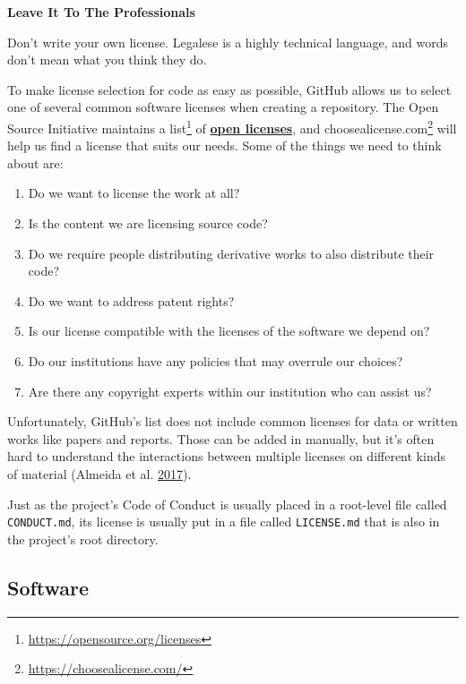 \documentclass[
]{krantz}
\providecommand{\tightlist}{%
  \setlength{\itemsep}{0pt}\setlength{\parskip}{0pt}}
\renewenvironment{quote}{\begin{VF}}{\end{VF}}
\renewcommand{\href}[2]{#2\footnote{\url{#1}}}
\newcommand{\gref}[2]{\hyperlink{#2}{\textbf{#1}}}
\begin{document}
\begin{quote}
\textbf{Leave It To The Professionals}

Don't write your own license.
Legalese is a highly technical language,
and words don't mean what you think they do.
\end{quote}

To make license selection for code as easy as possible,
GitHub allows us to select one of several common software licenses when creating a repository.
The Open Source Initiative maintains \href{https://opensource.org/licenses}{a list} of \gref{open licenses}{open\_license},
and \href{https://choosealicense.com/}{choosealicense.com} will help us find a license that suits our needs.
Some of the things we need to think about are:

\begin{enumerate}
\def\labelenumi{\arabic{enumi}.}
\tightlist
\item
  Do we want to license the work at all?
\item
  Is the content we are licensing source code?
\item
  Do we require people distributing derivative works to also distribute their code?
\item
  Do we want to address patent rights?
\item
  Is our license compatible with the licenses of the software we depend on?
\item
  Do our institutions have any policies that may overrule our choices?
\item
  Are there any copyright experts within our institution who can assist us?
\end{enumerate}

Unfortunately,
GitHub's list does not include common licenses for data or written works like papers and reports.
Those can be added in manually,
but it's often hard to understand the interactions between multiple licenses
on different kinds of material (Almeida et al. \protect\hyperlink{ref-Alme2017}{2017}).

Just as the project's Code of Conduct is usually placed in a root-level file called \texttt{CONDUCT.md},
its license is usually put in a file called \texttt{LICENSE.md}
that is also in the project's root directory.

\hypertarget{teams-license-software}{%
\subsection{Software}\label{teams-license-software}}
\end{document}
